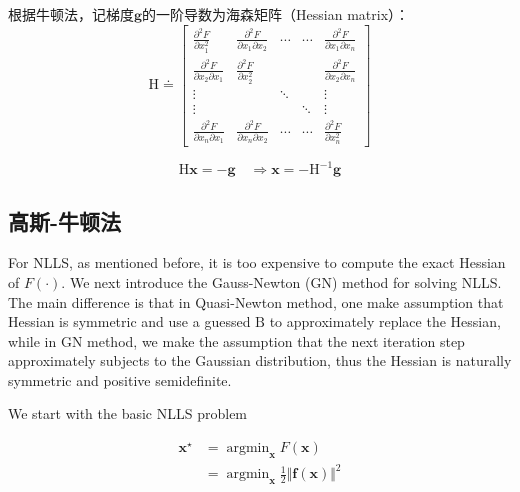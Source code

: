 根据牛顿法，记梯度$\bm{g}$的一阶导数为海森矩阵（Hessian matrix）：
\begin{equation}
    \mathrm{H} \doteq \begin{bmatrix}
        \frac{\partial^2 F}{\partial x_1^2} &
        \frac{\partial^2 F}{\partial x_1 \partial x_2} &
        \cdots & \cdots &
        \frac{\partial^2 F}{\partial x_1 \partial x_n} \\
        \frac{\partial^2 F}{\partial x_2 \partial x_1} &
        \frac{\partial^2 F}{\partial x_2^2} &
        & &
        \frac{\partial^2 F}{\partial x_2 \partial x_n} \\
        \vdots & & \ddots & & \vdots \\
        \vdots & & & \ddots & \vdots \\
        \frac{\partial^2 F}{\partial x_n \partial x_1} &
        \frac{\partial^2 F}{\partial x_n \partial x_2} &
        \cdots & \cdots &
        \frac{\partial^2 F}{\partial x_n^2}
    \end{bmatrix}
\end{equation}

\begin{equation}
    \mathrm{H} \bm{x} = -\bm{g} \quad
    \Rightarrow \bm{x} = -\mathrm{H}^{-1} \bm{g}
\end{equation}

\subsection{高斯-牛顿法}\label{sec:gn}

For NLLS, as mentioned before, it is too expensive to compute the exact Hessian of $F(\cdot)$. We next introduce the Gauss-Newton (GN) method for solving NLLS. The main difference is that in Quasi-Newton method, one make assumption that Hessian is symmetric and use a guessed $\mathrm{B}$ to approximately replace the Hessian, while in GN method, we make the assumption that the next iteration step approximately subjects to the Gaussian distribution, thus the Hessian is naturally symmetric and positive semidefinite.

We start with the basic NLLS problem

\begin{equation}\label{eq:nlls}
\begin{aligned}
    \bm{x}^\star &= \mathop{\arg\min}_{\bm{x}} F(\bm{x}) \\
                 &= \mathop{\arg\min}_{\bm{x}}
                    \frac{1}{2} \Vert \mathbf{f}(\bm{x}) \Vert^2
\end{aligned}
\end{equation}


